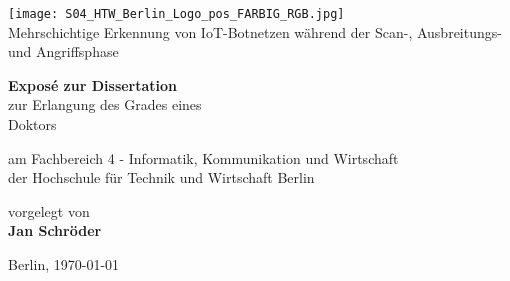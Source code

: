 \documentclass[
    a4paper,
    pagesize,
	pdftex,
    12pt,
]{scrartcl}
\begin{document}
\begin{titlepage}
    \begin{center}
        
        \texttt{[image: S04\_HTW\_Berlin\_Logo\_pos\_FARBIG\_RGB.jpg]} \\
        \vspace{1.0cm}
         Mehrschichtige Erkennung von IoT-Botnetzen während der Scan-, Ausbreitungs- und Angriffsphase
             
        \vspace{1.5cm}
 
        \textbf{Exposé zur Dissertation} \\    
        zur Erlangung des Grades eines\\
        Doktors

        \vspace{1.5cm}
        am Fachbereich 4 - Informatik, Kommunikation und Wirtschaft\\
        der Hochschule für Technik und Wirtschaft Berlin\\
        
        \vspace{1.5cm}

        vorgelegt von \\
        \textbf{Jan Schröder}
      
        \vspace{1.5cm}    
        Berlin, \today\\
        
             
    \end{center}
\end{titlepage}


\tableofcontents
\newpage



\newpage

\newpage

\newpage

\newpage

\newpage

\newpage

\newpage



\end{document}
